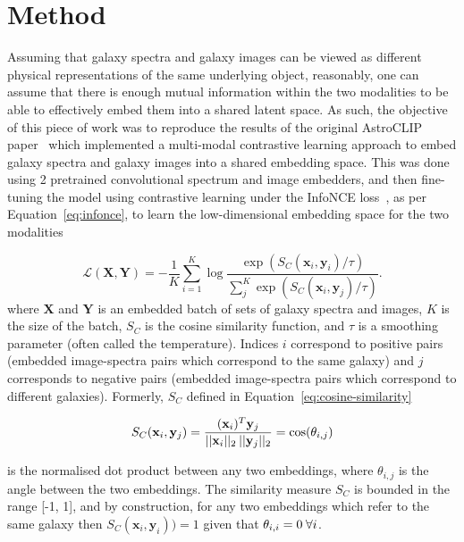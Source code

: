 
\section{Method}\label{sec:method}
Assuming that galaxy spectra and galaxy images can be viewed as different physical representations of the same underlying
object, reasonably, one can assume that there is enough mutual information within the two modalities to be able to effectively
embed them into a shared latent space.
As such, the objective of this piece of work was to reproduce the results of the original AstroCLIP paper~\citep{astroclip}
which implemented a multi-modal contrastive learning approach to embed galaxy spectra and galaxy images into a shared embedding
space.
This was done using 2 pretrained convolutional spectrum and image embedders, and then fine-tuning the model using contrastive
learning under the InfoNCE loss~\citep{oord2019}, as per Equation~\eqref{eq:infonce}, to learn the low-dimensional
embedding space for the two modalities

\begin{equation}
\label{eq:infonce}
    \mathcal{L}(\mathbf{X}, \mathbf{Y}) = - \frac{1}{K} \sum_{i=1}^K \log \frac{\exp(S_C(\mathbf{x}_i, \mathbf{y}_i) / \tau)}{\sum_{j}^K \exp(S_C(\mathbf{x}_i, \mathbf{y}_j) / \tau)}.
\end{equation}
where $\mathbf{X}$ and $\mathbf{Y}$ is an embedded batch of sets of galaxy spectra and images, $K$ is the size of the
batch, $S_C$ is the cosine similarity function, and $\tau$ is a smoothing parameter (often called the temperature).
Indices $i$ correspond to positive pairs (embedded image-spectra pairs which correspond to the same galaxy) and $j$ corresponds
to negative pairs (embedded image-spectra pairs which correspond to different galaxies).
Formerly, $S_C$ defined in Equation~\eqref{eq:cosine-similarity}

\begin{equation}
\label{eq:cosine-similarity}
    S_C(\mathbf{x}_i, \mathbf{y}_j) = \frac{(\mathbf{x}_i)^{T} \mathbf{y}_j}{ ||\mathbf{x}_i||_{2} \hspace{0.2em} ||\mathbf{y}_j||_{2}}
    = \cos(\theta_{i,j})
\end{equation}

is the normalised dot product between any two embeddings, where $\theta_{i,j}$ is the angle between the two embeddings.
The similarity measure $S_C$ is bounded in the range [-1, 1], and by construction, for any two embeddings which refer to
the same galaxy then $S_C(\mathbf{x}_i, \mathbf{y}_i)) = 1$ given that $\theta_{i,i} = 0 \hspace{0.25em} \forall i$.

